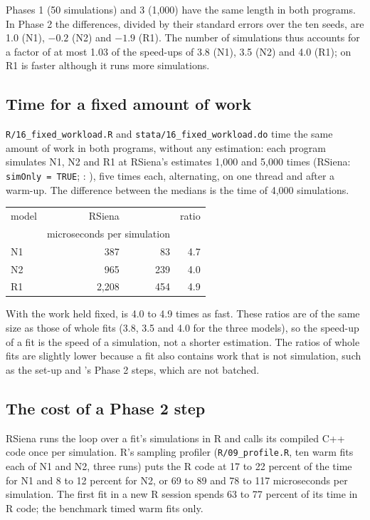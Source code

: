 Phases 1 (50 simulations) and 3 (1,000) have the same length in both programs. In
Phase 2 the differences, divided by their standard errors over the ten seeds, are
1.0 (N1), $-0.2$ (N2) and $-1.9$ (R1). The number of simulations thus accounts for
a factor of at most 1.03 of the speed-ups of 3.8 (N1), 3.5 (N2) and 4.0 (R1); on R1
\nwsaom{} is faster although it runs more simulations.

\subsection{Time for a fixed amount of work}\label{sec:samest-workload}

\texttt{R/16\_fixed\_workload.R} and \texttt{stata/16\_fixed\_workload.do} time
the same amount of work in both programs, without any estimation: each program
simulates N1, N2 and R1 at RSiena's estimates 1,000 and 5,000 times (RSiena:
\texttt{simOnly = TRUE}; \nwsaom{}: ), five times each, alternating,
on one thread and after a warm-up. The difference between the medians is the time of
4,000 simulations.

\begin{center}
\small
\begin{tabular}{lrrr}
\toprule
model & RSiena & \nwsaom{} & ratio \\
 & \multicolumn{2}{c}{microseconds per simulation} & \\
\midrule
N1 & 387 & 83 & 4.7 \\
N2 & 965 & 239 & 4.0 \\
R1 & 2,208 & 454 & 4.9 \\
\bottomrule
\end{tabular}
\end{center}

With the work held fixed, \nwsaom{} is 4.0 to 4.9 times as fast. These ratios are of
the same size as those of whole fits (3.8, 3.5 and 4.0 for the three models), so the
speed-up of a fit is the speed of a simulation, not a shorter estimation. The ratios
of whole fits are slightly lower because a fit also contains work that is not
simulation, such as the set-up and \nwsaom{}'s Phase 2 steps, which are not batched.

\subsection{The cost of a Phase 2 step}

RSiena runs the loop over a fit's simulations in R and calls its compiled C++ code
once per simulation. R's sampling profiler (\texttt{R/09\_profile.R}, ten warm fits
each of N1 and N2, three runs) puts the R code at 17 to 22 percent of the time for
N1 and 8 to 12 percent for N2, or 69 to 89 and 78 to 117 microseconds per
simulation. The first fit in a new R session spends 63 to 77 percent of its time in
R code; the benchmark timed warm fits only.

